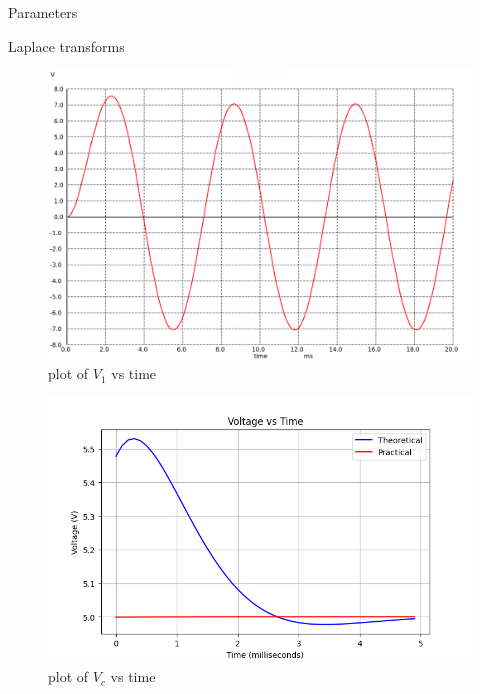 \documentclass[journal,12pt,twocolumn]{IEEEtran}
\begin{document}
\begin{table}[ht]
    \begin{adjustbox}{width=\columnwidth}
       
    \end{adjustbox}
    \caption{Parameters}
    \label{tab:Gate.ee.54.1}

\end{table}


\begin{table}[ht]
    
    \caption{Laplace transforms}
    \label{tab:Gate.ee.54.2}
\end{table}

\begin{figure}[htbp]
    \centering
    \includegraphics[width=\columnwidth]{figs/fig1.png}
    \caption{plot of $V_1$ vs time}
\end{figure}

\begin{figure}[htbp]
    \centering
    \includegraphics[width=\columnwidth]{figs/fig3.png}
    \caption{plot of $V_c$ vs time}
\end{figure}
\end{document}
